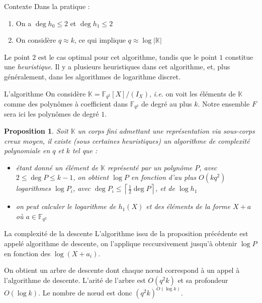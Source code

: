\documentclass[xcolor=x11names,compress]{beamer}
\theoremstyle{break}
\newtheorem{prop}[thm]{Proposition}
\theoremstyle{sc}
\theoremstyle{definition}
\theoremstyle{remark}
\newcommand{\ie}{\emph{i.e. }}
\begin{document}
\begin{frame}{Contexte}
  Dans la pratique :
  \begin{enumerate}
    \item On a $\deg h_0 \leq 2$ et $\deg h_1 \leq 2$
    \item On considère $q \approx k$, ce qui implique $q\approx \log|\mathbb{K}|$
  \end{enumerate}

Le point $2$ est le cas optimal pour cet algorithme, tandis que le point $1$
constitue une \emph{heuristique}. Il y a plusieurs heuristiques dans cet
algorithme, et, plus généralement, dans les algorithmes de logarithme discret.
\end{frame}

\begin{frame}{L'algorithme}
  On considère $\mathbb{K} = \mathbb{F}_{q^2}[X]/(I_X)$, \ie on voit les
  éléments de $\mathbb{K}$ comme des polynômes à coefficient dans
  $\mathbb{F}_{q^2}$ de degré au plus $k$. Notre ensemble $F$ sera ici les
  polynômes de degré $1$.

  \begin{prop}
    Soit $\mathbb{K}$ un corps fini admettant une représentation via sous-corps
    creux moyen, il existe (sous certaines heuristiques) un algorithme de
    complexité polynomiale en $q$ et $k$ tel que :
    \begin{itemize}
      \item étant donné un élément de $\mathbb{K}$ représenté par un polynôme
        $P$, avec $2\leq \deg P \leq k-1$, on obtient $\log P$ en fonction d'au
        plus $O(kq^2)$ logarithmes $\log P_i$, avec $\deg P_i \leq \left\lceil
        \frac{1}{2}\deg P\right\rceil$, et de $\log h_1$
      \item on peut calculer le logarithme de $h_1(X)$ et des éléments de la
        forme $X+a$ où $a\in \mathbb{F}_{q^2}$
    \end{itemize}
  \end{prop}
  
\end{frame}

\begin{frame}{La complexité de la descente}
 L'algorithme issu de la proposition précédente est appelé algorithme de
 descente, on l'applique reccursivement jusqu'à obtenir $\log P$ en fonction des
 $\log(X + a_i)$.

 On obtient un arbre de descente dont chaque nœud correspond à un appel à
 l'algorithme de descente. L'arité de l'arbre est $O(q^2k)$ et sa profondeur
 $O(\log k)$. Le nombre de nœud est donc $(q^2k)^{O(\log k)}$.
\end{frame}
\end{document}
